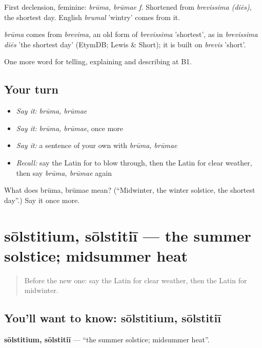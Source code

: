 First declension, feminine: \emph{brūma, brūmae f.} Shortened from \emph{brevissima (diēs)}, the shortest day. English \emph{brumal} 'wintry' comes from it.

\begin{cousinweb}
\emph{brūma} comes from \emph{brevima}, an old form of \emph{brevissima} 'shortest', as in \emph{brevissima diēs} 'the shortest day' (EtymDB; Lewis \& Short); it is built on \emph{brevis} 'short'.
\end{cousinweb}

\begin{grammarlens}[title={What you've built}]
One more word for telling, explaining and describing at B1.
\end{grammarlens}

\subsection*{Your turn}
\begin{itemize}
\raggedright
  \item \emph{Say it:} \emph{brūma, brūmae}
  \item \emph{Say it:} \emph{brūma, brūmae}, once more
  \item \emph{Say it:} a sentence of your own with \emph{brūma, brūmae}
  \item \emph{Recall:} say the Latin for to blow through, then the Latin for clear weather, then say \emph{brūma, brūmae} again
\end{itemize}

\begin{tcolorbox}[breakable,colback=teal!4,colframe=teal!35!black,title={Before you move on}]
What does brūma, brūmae mean? (\textquotedblleft{}Midwinter, the winter solstice, the shortest day\textquotedblright{}.) Say it once more.
\end{tcolorbox}
\section[sōlstitium, sōlstitiī]{sōlstitium, sōlstitiī — the summer solstice; midsummer heat}

\label{lesson:LA-C488-solstitium}



\begin{quote}
Before the new one: say the Latin for clear weather, then the Latin for midwinter.
\end{quote}

\subsection*{You'll want to know: sōlstitium, sōlstitiī}
\textbf{sōlstitium, sōlstitiī} — \textquotedblleft{}the summer solstice; midsummer heat\textquotedblright{}.

